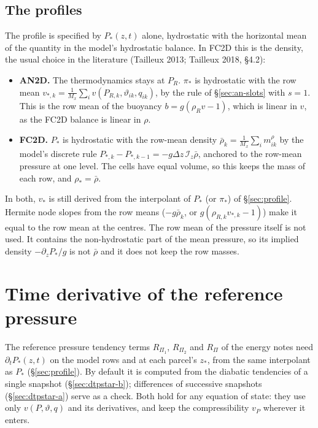 \documentclass[11pt,a4paper]{article}
\newcommand{\vt}{\vartheta}
\newcommand{\Iz}{\mathcal{I}_z}
\newcommand{\zs}{z_{*}}
\begin{document}
\subsection{The profiles}\label{sec:mean-profiles}
The profile is specified by $P_*(z,t)$ alone, hydrostatic with the horizontal mean of the quantity in the model's hydrostatic
balance. In FC2D this is the density, the usual choice in the literature (Tailleux 2013; Tailleux 2018, \S4.2):
\begin{itemize}
  \item \textbf{AN2D.} The thermodynamics stays at $P_R$. $\pi_*$ is hydrostatic with the row mean
        $v_{*,k}=\frac1{M_x}\sum_iv(P_{R,k},\vt_{ik},q_{ik})$, by the rule of \S\ref{sec:an-slots} with $s=1$. This is the row
        mean of the buoyancy $b=g(\rho_Rv-1)$, which is linear in $v$, as the FC2D balance is linear in $\rho$.
  \item \textbf{FC2D.} $P_*$ is hydrostatic with the row-mean density $\bar\rho_k=\frac1{M_x}\sum_i m^\rho_{ik}$ by the
        model's discrete rule $P_{*,k}-P_{*,k-1}=-g\Delta z\,\Iz\bar\rho$, anchored to the row-mean pressure at one level.
        The cells have equal volume, so this keeps the mass of each row, and $\rho_*=\bar\rho$.
\end{itemize}
In both, $v_*$ is still derived from the interpolant of $P_*$ (or $\pi_*$) of \S\ref{sec:profile}. Hermite node slopes from the
row means ($-g\bar\rho_k$, or $g(\rho_{R,k}v_{*,k}-1)$) make it equal to the row mean at the centres. The row mean of the
pressure itself is not used. It contains the non-hydrostatic part of the mean pressure, so its implied density
$-\partial_zP_*/g$ is not $\bar\rho$ and it does not keep the row masses.

\section{Time derivative of the reference pressure}\label{sec:dtpstar}
The reference pressure tendency terms $R_{\Pi_1}$, $R_{\Pi_2}$ and $R_\Pi$ of the energy notes need $\partial_tP_*(z,t)$ on the
model rows and at each parcel's $\zs$, from the same interpolant as $P_*$ (\S\ref{sec:profile}). By default it is computed
from the diabatic tendencies of a single snapshot (\S\ref{sec:dtpstar-b}); differences of successive snapshots
(\S\ref{sec:dtpstar-a}) serve as a check. Both hold for any equation of state: they use only $v(P,\vt,q)$ and its derivatives,
and keep the compressibility $v_P$ wherever it enters.
\end{document}
